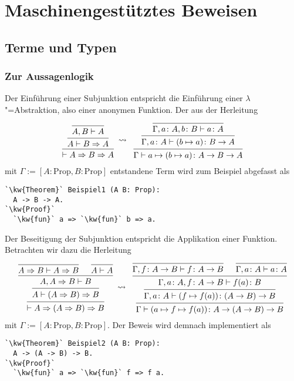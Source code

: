
\chapter{Maschinengestütztes Beweisen}

\section{Terme und Typen}

\subsection{Zur Aussagenlogik}

Der Einführung einer Subjunktion entspricht die
Einführung einer $\lambda$"=Abstraktion,%
 also einer anonymen
Funktion. Der aus der Herleitung
\[\begin{prooftree}
    \infer0{A,B\vdash A}
  \infer1{A\vdash B\cond A}
\infer1{\vdash A\cond B\cond A}
\end{prooftree}
\;\rightsquigarrow\;\;
\begin{prooftree}
    \infer0{\Gamma, a\colon A, b\colon B\vdash a\colon A}
  \infer1{\Gamma, a\colon A\vdash (b\mapsto a)\colon B\to A}
\infer1{\Gamma\vdash a\mapsto (b\mapsto a)\colon A\to B\to A}
\end{prooftree}\]
mit $\Gamma:=[A\colon\mathrm{Prop}, B\colon\mathrm{Prop}]$ entstandene
Term wird zum Beispiel abgefasst als
\begin{lstlisting}[escapechar=`, xleftmargin=\mathindent]
`\kw{Theorem}` Beispiel1 (A B: Prop):
  A -> B -> A.
`\kw{Proof}`
  `\kw{fun}` a => `\kw{fun}` b => a.
\end{lstlisting}
Der Beseitigung der Subjunktion entspricht die Applikation einer
Funktion. Betrachten wir dazu die Herleitung
\[\begin{prooftree}
      \infer0{A\cond B\vdash A\cond B}
      \infer0{A\vdash A}
    \infer2{A,A\cond B\vdash B}
  \infer1{A\vdash (A\cond B)\cond B}
\infer1{\vdash A\cond (A\cond B)\cond B}
\end{prooftree}
\;\rightsquigarrow\;\;
\begin{prooftree}
      \infer0{\Gamma,f\colon A\to B\vdash f\colon A\to B}
      \infer0{\Gamma,a\colon A\vdash a\colon A}
    \infer2{\Gamma,a\colon A, f\colon A\to B\vdash f(a)\colon B}
  \infer1{\Gamma,a\colon A\vdash (f\mapsto f(a))\colon (A\to B)\to B}
\infer1{\Gamma\vdash (a\mapsto f\mapsto f(a))\colon A\to (A\to B)\to B}
\end{prooftree}\]
mit $\Gamma:=[A\colon\mathrm{Prop}, B\colon\mathrm{Prop}]$.
Der Beweis wird demnach implementiert als
\begin{lstlisting}[escapechar=`, xleftmargin=\mathindent]
`\kw{Theorem}` Beispiel2 (A B: Prop):
  A -> (A -> B) -> B.
`\kw{Proof}`
  `\kw{fun}` a => `\kw{fun}` f => f a.
\end{lstlisting}

